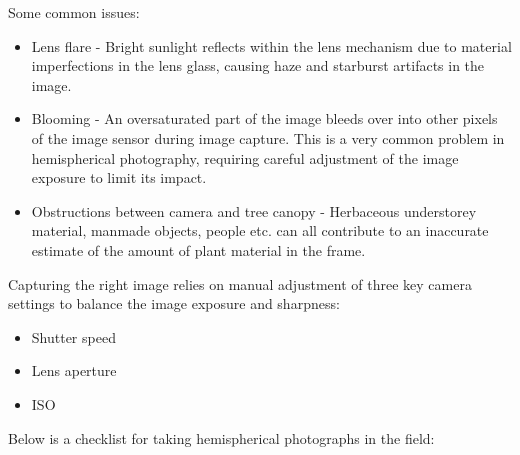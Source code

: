 \documentclass{article}
\begin{document}
Some common issues:

\begin{itemize}
	\item{Lens flare - Bright sunlight reflects within the lens mechanism due to material imperfections in the lens glass, causing haze and starburst artifacts in the image.}
	\item{Blooming - An oversaturated part of the image bleeds over into other pixels of the image sensor during image capture. This is a very common problem in hemispherical photography, requiring careful adjustment of the image exposure to limit its impact.}
	\item{Obstructions between camera and tree canopy - Herbaceous understorey material, manmade objects, people etc. can all contribute to an inaccurate estimate of the amount of plant material in the frame.}
\end{itemize}

Capturing the right image relies on manual adjustment of three key camera settings to balance the image exposure and sharpness:

\begin{itemize}
	\item{Shutter speed}
	\item{Lens aperture}
	\item{ISO}
\end{itemize}

Below is a checklist for taking hemispherical photographs in the field:
\end{document}

